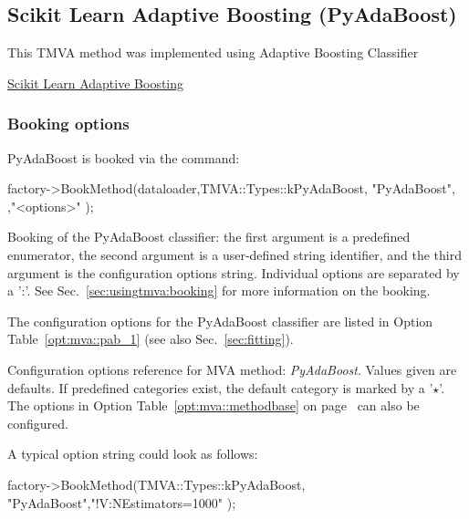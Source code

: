 \subsection{Scikit Learn Adaptive Boosting (PyAdaBoost)}
\label{sec:PyAdaBoost}

This TMVA method was implemented using Adaptive Boosting Classifier 
 
\href{http://scikit-learn.org/stable/modules/ensemble.html#adaboost}{Scikit Learn Adaptive Boosting}


\subsubsection{Booking options}

PyAdaBoost is booked via the command:
\begin{codeexample}
\begin{tmvacode}
factory->BookMethod(dataloader,TMVA::Types::kPyAdaBoost, "PyAdaBoost",
,"<options>" );
\end{tmvacode}
\caption[.]{\codeexampleCaptionSize Booking of the PyAdaBoost classifier: the first argument is 
		   a predefined enumerator, the second argument is a user-defined 
		   string identifier, and the third argument is the configuration options string.
         Individual options are separated by a ':'. 
         See Sec.~\ref{sec:usingtmva:booking} for more information on the booking.}
\end{codeexample}

The configuration options for the PyAdaBoost classifier are listed in Option Table~\ref{opt:mva::pab_1}
(see also Sec.~\ref{sec:fitting}).

\begin{option}[p]

\caption[.]{\optionCaptionSize 
     Configuration options reference for MVA method: {\em PyAdaBoost}.
     Values given are defaults. If predefined categories exist, the default category 
     is marked by a '$\star$'. The options in Option Table~\ref{opt:mva::methodbase} on 
     page~\pageref{opt:mva::methodbase} can also be configured.
}
\label{opt:mva::pab_1}
\end{option}



A typical option string could look as follows:
\begin{codeexample}
\begin{tmvacode}
 factory->BookMethod(TMVA::Types::kPyAdaBoost, "PyAdaBoost","!V:NEstimators=1000" );
\end{tmvacode}
\label{ce:PyAdaBoostexample}
\end{codeexample}

